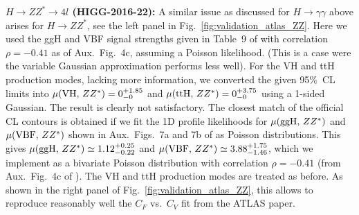 {\bf\boldmath $H\to ZZ^*\to 4l$ (HIGG-2016-22):} A similar issue as discussed for $H\to\gamma\gamma$ above arises 
for $H\to ZZ^*$, see the left panel in Fig.~\ref{fig:validation_atlas_ZZ}. Here we used the ggH and VBF signal strengths 
given in Table~9 of \cite{Aaboud:2017vzb} with correlation $\rho=-0.41$ as of Aux.\ Fig.~4c, assuming a Poisson likelihood. 
(This is a case were the variable Gaussian approximation performs less well). 
For the VH and ttH production modes, lacking more information, we converted the given 95\%~CL limits into 
$\mu({\rm VH},\,ZZ^*)=0^{+1.85}_{-0}$ and $\mu({\rm ttH},\,ZZ^*)=0^{+3.75}_{-0}$ using a 1-sided Gaussian. 
The result is clearly not satisfactory. The closest match of the official CL contours is obtained if 
we fit the 1D profile likelihoods for $\mu({\rm ggH},\,ZZ^*)$ and $\mu({\rm VBF},\,ZZ^*)$ shown in Aux.\ Figs.~7a and 7b 
of \cite{Aaboud:2017vzb} as Poisson distributions. This gives $\mu({\rm ggH},\,ZZ^*)\simeq 1.12^{+0.25}_{-0.22}$ and 
$\mu({\rm VBF},\,ZZ^*)\simeq 3.88^{+1.75}_{-1.46}$, which we implement as a bivariate Poisson distribution with    
correlation $\rho=-0.41$ (from Aux.\ Fig.~4c of \cite{Aaboud:2017vzb}). The VH and ttH production modes are treated as before.
As shown in the right panel of Fig.~\ref{fig:validation_atlas_ZZ}, this allows to reproduce reasonably well the $C_F$ vs.\ $C_V$ 
fit from the ATLAS paper.

